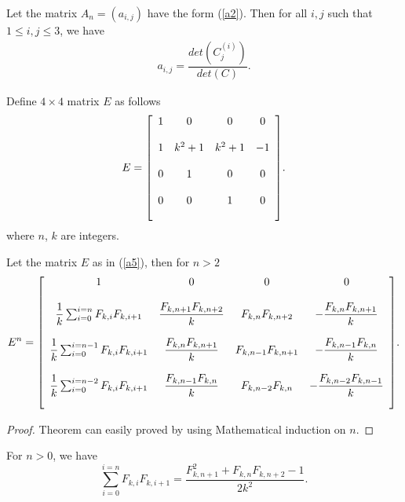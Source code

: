 \begin{theorem}
Let the matrix $A_n = (a_{i,j})$ have the form (\ref{a2}). Then for all $i, j$ such that $1 \leq i, j \leq 3$, we have
\begin{align*}
a_{i,j} = \dfrac{det(C_j^{(i)})}{det (C)}.
\end{align*}
\end{theorem}
\begin{definition}\label{a5}
Define $4 \times 4$ matrix $E$ as follows
\begin{align*}
E = {\left[
          \begin{array}{cccc}
           \bigskip
            1 & 0&0 & 0 \\
             \bigskip
            1 & k^2 + 1 & k^2 + 1 & -1 \\
             \bigskip
            0 & 1 & 0 &0\\
            \bigskip
            0 & 0 & 1 & 0\\
          \end{array}
        \right]}.
\end{align*}
where  $n$, $k$ are integers.
\end{definition}
\begin{theorem}
Let the matrix $E$ as in (\ref{a5}), then for $n > 2$
\begin{align*}
E^n = {\left[
          \begin{array}{cccc}
           \bigskip
            1 & 0&0 & 0 \\
             \bigskip
            \dfrac{1}{k}\sum_{i=0}^{i=n}F_{k,i}F_{k,i+1} & \dfrac{F_{k,n+1}F_{k,n+2}}{k}  & F_{k,n}F_{k,n+2} & -\dfrac{F_{k,n}F_{k,n+1}}{k} \\
             \bigskip
            \dfrac{1}{k}\sum_{i=0}^{i=n-1}F_{k,i}F_{k,i+1} & \dfrac{F_{k,n}F_{k,n+1}}{k} & F_{k,n-1}F_{k,n+1} &-\dfrac{F_{k,n-1}F_{k,n}}{k}\\
            \bigskip
            \dfrac{1}{k}\sum_{i=0}^{i=n-2}F_{k,i}F_{k,i+1} & \dfrac{F_{k,n-1}F_{k,n}}{k}  & F_{k,n-2}F_{k,n} & -\dfrac{F_{k,n-2}F_{k,n-1}}{k}\\
          \end{array}
        \right]}.
\end{align*}
\end{theorem}
\begin{proof}
Theorem can easily proved by using Mathematical induction on $n$.
\end{proof}
\begin{theorem}
For $n > 0$, we have 
\begin{equation}
\sum_{i=0}^{i=n}F_{k,i}F_{k,i+1} = \dfrac{F_{k,n+1}^2+ F_{k,n}F_{k,n+2}-1}{2 k^2}.
\end{equation}
\end{theorem}
